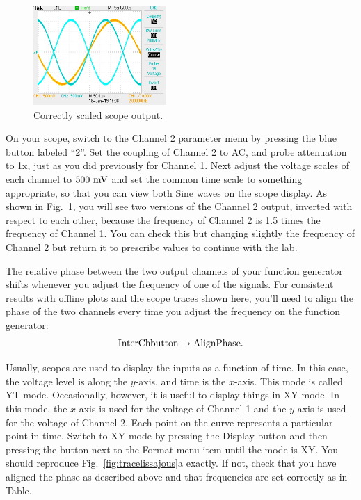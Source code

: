 \begin{figure}[htbp]
\begin{center}
\includegraphics[width=0.45\textwidth]{figs/labs/lissajous/two_sine.jpg} 
\caption{Correctly scaled scope output.}
\label{fig:twosine}
\end{center}
\end{figure}

On your scope, switch to the Channel 2 parameter menu by pressing the
blue button labeled ``2''.  Set the coupling of Channel 2 to AC, and
probe attenuation to 1x, just as you did previously for Channel 1.
Next adjust the voltage scales of each channel to $500~\rm mV$ and set
the common time scale to something appropriate, so that you can view
both Sine waves on the scope display.  As shown in Fig.~\ref{fig:twosine},
you will see two versions of the Channel 2 output, inverted with
respect to each other, because the frequency of Channel 2 is 1.5 times
the frequency of Channel 1. You can check this but changing slightly the frequency of 
Channel 2 but return it to prescribe values to continue with the lab.

The relative phase between the two output channels of your function
generator shifts whenever you adjust the frequency of one of the
signals.  For consistent results with offline plots and the scope
traces shown here, you'll need to align the phase of the two channels
every time you adjust the frequency on the function generator:
\begin{displaymath}
\rm Inter Ch button \to AlignPhase.
\end{displaymath}

Usually, scopes are used to display the inputs as a function of time.
In this case, the voltage level is along the $y$-axis, and time is the
$x$-axis.  This mode is called YT mode.  Occasionally, however, it is
useful to display things in XY mode.  In this mode, the $x$-axis is
used for the voltage of Channel 1 and the $y$-axis is used for the
voltage of Channel 2.  Each point on the curve represents a particular
point in time.  Switch to XY mode by pressing the Display button and
then pressing the button next to the Format menu item until the mode
is XY.  You should reproduce Fig.~\ref{fig:tracelissajous}a
exactly.  If not, check that you have aligned the phase as described
above and that frequencies are set correctly as in Table.

